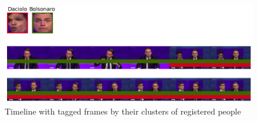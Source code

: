\begin{figure}[!ht]
    \centering
    \includegraphics[width=0.6\linewidth]{img/webmedia/timeline_pol.png}
\vspace{-1em}
    \caption{Timeline with tagged frames by their clusters of registered people}
    \label{fig:timeline_pol}
\end{figure}


